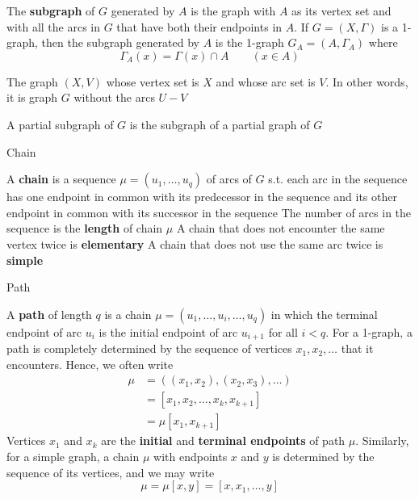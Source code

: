 \documentclass[aspectratio=43]{beamer}
\begin{document}
\begin{frame}
\begin{definition}
The \textbf{subgraph} of $G$ generated by $A$ is the graph with $A$ as its vertex set and with all the arcs in $G$ that have both their endpoints in $A$. If $G=(X,\Gamma)$ is a 1-graph, then the subgraph generated by $A$ is the 1-graph $G_A=(A,\Gamma_A)$ where
\[
\Gamma_A(x)=\Gamma(x)\cap A\qquad (x\in A)
\]
\end{definition}
\vfill
\begin{definition}
\label{def:partial_graph}
The graph $(X,V)$ whose vertex set is $X$ and whose arc set is $V$. 
In other words, it is graph $G$ without the arcs $U-V$
\end{definition}
\vfill
\begin{definition}
A partial subgraph of $G$ is the subgraph of a partial graph of $G$
\end{definition}
\end{frame}


\begin{frame}{Chain}
\begin{definition}
A \textbf{chain} is a sequence $\mu=(u_1,\ldots, u_q)$ of arcs of $G$ s.t. each arc in the sequence has one endpoint in common with its predecessor in the sequence and its other endpoint in common with its successor in the sequence
\vskip1cm 
The number of arcs in the sequence is the \textbf{length} of chain $\mu$
\vskip1cm
A chain that does not encounter the same vertex twice is \textbf{elementary}
\vskip1cm
A chain that does not use the same arc twice is \textbf{simple}
\end{definition}
\end{frame}


\begin{frame}{Path}
\begin{definition}\label{def:path_length_q}
A \textbf{path} of length $q$ is a chain $\mu=(u_1, \ldots, u_i, \ldots, u_q)$
in which the terminal endpoint of arc $u_i$ is the initial endpoint of arc $u_{i+1}$ for all $i < q$. 
For a 1-graph, a path is completely determined by the sequence of vertices $x_1,x_2,\ldots$ that it encounters. Hence, we often write
\begin{align*}
\mu &=
((x_1,x_2), (x_2, x_3), \ldots) \\
&= [x_1, x_2, \ldots, x_k ,x_{k+1}] \\
&= \mu[x_1,x_{k+1}]
\end{align*}
Vertices $x_1$ and $x_k$ are the \textbf{initial} and \textbf{terminal endpoints} of path $\mu$.
Similarly, for a simple graph, a chain $\mu$ with endpoints $x$ and $y$ is determined by the sequence of its vertices, and we may write
\[
\mu=\mu[x,y] = [x,x_1,\ldots,y]
\]
\end{definition}
\end{frame}
\end{document}
